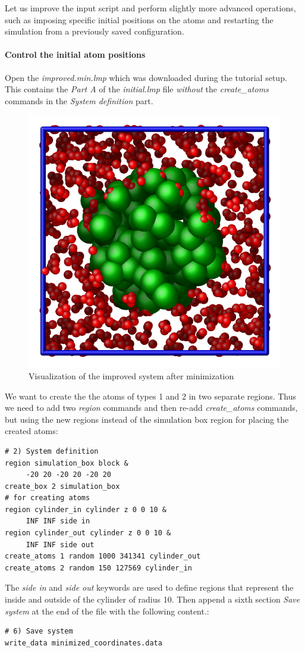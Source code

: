 \documentclass[9pt,tutorial]{livecoms}
\begin{document}
Let us improve the input script and perform slightly more advanced operations,
such as imposing specific initial positions on the atoms and restarting the
simulation from a previously saved configuration.

\paragraph{Control the initial atom positions}
Open the \textit{improved.min.lmp} which was downloaded during the
tutorial setup.  This contains the \textit{Part A} of the
\textit{initial.lmp} file \emph{without} the \textit{create\_atoms}
commands in the \textit{System definition} part.

\begin{figure}
\centering
\includegraphics[width=0.55\linewidth]{LJ-cylinder}
\caption{Visualization of the improved system after minimization}
\label{fig:improved-min}
\end{figure}

We want to create the the atoms of types 1 and 2 in two separate
regions.  Thus we need to add two \textit{region} commands and then
re-add \textit{create\_atoms} commands, but using the new regions
instead of the simulation box region for placing the created atoms:
{\normalsize
\begin{verbatim}
# 2) System definition
region simulation_box block &
     -20 20 -20 20 -20 20
create_box 2 simulation_box
# for creating atoms
region cylinder_in cylinder z 0 0 10 &
     INF INF side in
region cylinder_out cylinder z 0 0 10 &
     INF INF side out
create_atoms 1 random 1000 341341 cylinder_out
create_atoms 2 random 150 127569 cylinder_in
\end{verbatim}
}
The \textit{side in} and \textit{side out} keywords are used to define
regions that represent the inside and outside of the cylinder of radius
10. Then append a sixth section \textit{Save system} at the end of the
file with the following content.:
{\normalsize
\begin{verbatim}
# 6) Save system
write_data minimized_coordinates.data
\end{verbatim}
}
\end{document}
